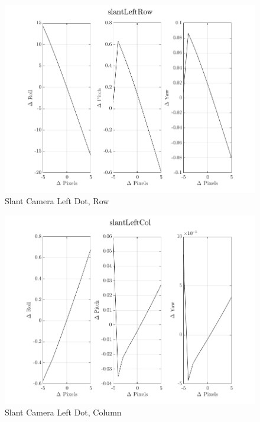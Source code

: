 \documentclass[12pt]{article}
\begin{document}
\begin{multicols}{2}
\begin{figure}[H]
	\includegraphics[width=0.9\columnwidth]{slantLeftRow.png}
	\caption{Slant Camera Left Dot, Row\label{fig:slantLeftRow}}
\end{figure}

\begin{figure}[H]
	\includegraphics[width=0.9\columnwidth]{slantLeftCol.png}
	\caption{Slant Camera Left Dot, Column\label{fig:slantLeftCol}}
\end{figure}


\end{multicols}
\end{document}
